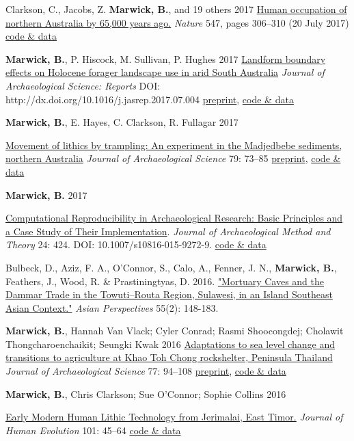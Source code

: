 \documentclass[11pt,article,oneside]{memoir}
\begin{document}
\ind  Clarkson, C., Jacobs, Z. \textbf{Marwick, B.}, and 19 others 2017 \href{http://dx.doi.org/10.1038/nature22968}{Human occupation of northern Australia by 65,000 years ago.} \textit{Nature} 547, pages 306–310 (20 July 2017) \href{https://doi.org/10.17605/OSF.IO/QWFCZ}{code \& data}

\ind  \textbf{Marwick, B.}, P. Hiscock, M. Sullivan, P. Hughes 2017 \href{http://dx.doi.org/10.1016/j.jasrep.2017.07.004}{Landform boundary effects on Holocene forager landscape use in arid South Australia} \textit{Journal of Archaeological Science: Reports} DOI: http://dx.doi.org/10.1016/j.jasrep.2017.07.004 \href{https://doi.org/10.17605/OSF.IO/V2MS9}{preprint}, \href{https://doi.org/10.17605/OSF.IO/EDZXS}{code \& data}

\ind  \textbf{Marwick, B.}, E. Hayes, C. Clarkson, R. Fullagar 2017 {\href{https://doi.org/10.1016/j.jas.2017.01.008}{Movement of lithics by trampling: An experiment in the Madjedbebe sediments, northern Australia} \textit{Journal of Archaeological Science}  79: 73–85 \href{https://doi.org/10.17605/OSF.IO/V2MS9}{preprint}, \href{https://doi.org/10.17605/OSF.IO/EDZXS}{code \& data}

\ind \textbf{Marwick, B.} 2017 {\href{http://dx.doi.org/10.1007/s10816-015-9272-9}{Computational Reproducibility in Archaeological Research: Basic Principles and a Case Study of Their Implementation}. \textit{Journal of Archaeological Method and Theory} 24: 424. DOI: 10.1007/s10816-015-9272-9. \href{https://doi.org/10.6084/m9.figshare.1563661}{code \& data}

\ind  Bulbeck, D., Aziz, F. A.,  O'Connor, S.,  Calo, A., Fenner, J. N., \textbf{Marwick, B.},  Feathers, J.,  Wood, R. \& Prastiningtyas, D. 2016. \href{http://dx.doi.org/10.1353/asi.2016.0017}{"Mortuary Caves and the Dammar Trade in the Towuti–Routa Region, Sulawesi, in an Island Southeast Asian Context."} \textit{Asian Perspectives} 55(2): 148-183.

\ind  \textbf{Marwick, B.}, Hannah Van Vlack; Cyler Conrad; Rasmi Shoocongdej; Cholawit Thongcharoenchaikit; Seungki Kwak 2016 \href{http://dx.doi.org/10.1016/j.jas.2016.10.010}{Adaptations to sea level change and transitions to agriculture at Khao Toh Chong rockshelter, Peninsula Thailand} \textit{Journal of Archaeological Science} 77: 94–108 \href{https://osf.io/preprints/socarxiv/axxf8/}{preprint}, \href{https://dx.doi.org/10.6084/m9.figshare.2065602}{code \& data}

\ind  \textbf{Marwick, B.}, Chris Clarkson; Sue O'Connor; Sophie Collins 2016 {\href{http://dx.doi.org/10.1016/j.jhevol.2016.09.004}{Early Modern Human Lithic Technology from Jerimalai, East Timor.} \textit{Journal of Human Evolution} 101: 45–64 \href{http://dx.doi.org/10.6084/m9.figshare.985406}{code \& data}

}}}
\end{document}
